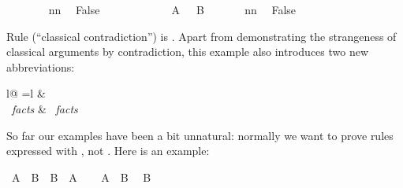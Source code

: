 \begin{isabellebody}
\isanewline
\ \ \ \ \ \ \isamarkupfalse%
\ nn\ \isamarkupfalse%
\ False\ \isacommand{{\isachardot}{\isachardot}}\isamarkupfalse%
\isanewline
\ \ \ \ \isamarkupfalse%
\isanewline
\ \ \ \ \isamarkupfalse%
\ {\isachardoublequoteopen}{\isasymnot}\ A\ {\isasymor}\ {\isasymnot}\ B{\isachardoublequoteclose}\ \isacommand{{\isachardot}{\isachardot}}\isamarkupfalse%
\isanewline
\ \ \ \ \isamarkupfalse%
\ nn\ \isamarkupfalse%
\ False\ \isacommand{{\isachardot}{\isachardot}}\isamarkupfalse%
\isanewline
\ \ \isamarkupfalse%
\isanewline
{}\isamarkupfalse%
%
\endisatagproof
{\isafoldproof}%
%
\isadelimproof
%
\endisadelimproof
%
\begin{isamarkuptext}%
\noindent
Rule  (``classical contradiction'') is
.
Apart from demonstrating the strangeness of classical
arguments by contradiction, this example also introduces two new
abbreviations:
\begin{center}
\begin{tabular}{l@ {\quad=\quad}l}
 &   \\
~\emph{facts} &
~\emph{facts} 
\end{tabular}
\end{center}%
\end{isamarkuptext}%
\isamarkuptrue%
%
\isamarkuptrue%
%
\begin{isamarkuptext}%
So far our examples have been a bit unnatural: normally we want to
prove rules expressed with \isa{{\isasymLongrightarrow}}, not \isa{{\isasymlongrightarrow}}. Here is an example:%
\end{isamarkuptext}%
\isamarkuptrue%
\isamarkupfalse%
\ {\isachardoublequoteopen}A\ {\isasymand}\ B\ {\isasymLongrightarrow}\ B\ {\isasymand}\ A{\isachardoublequoteclose}\isanewline
%
\isadelimproof
%
\endisadelimproof
%
\isatagproof
{}\isamarkupfalse%
\isanewline
\ \ \isamarkupfalse%
\ {\isachardoublequoteopen}A\ {\isasymand}\ B{\isachardoublequoteclose}\ \isamarkupfalse%
\ {\isachardoublequoteopen}B{\isachardoublequoteclose}\ \isacommand{{\isachardot}{\isachardot}}\isamarkupfalse%
\isanewline
{}\isamarkupfalse%
\isanewline
\ \ \isamarkupfalse%

\end{isabellebody}
